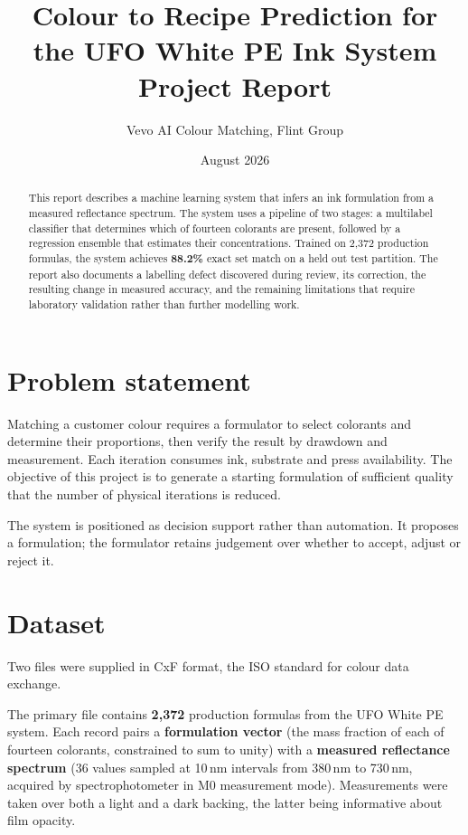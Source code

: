 \documentclass[11pt,a4paper]{article}
\title{\textbf{Colour to Recipe Prediction for the UFO White PE Ink System}\\[4pt]
       \large Project Report}
\author{Vevo AI Colour Matching, Flint Group}
\date{August 2026}
\newcommand{\keyfig}[1]{\textcolor{accent}{\textbf{#1}}}
\begin{document}
\maketitle

\begin{abstract}
\noindent
This report describes a machine learning system that infers an ink formulation
from a measured reflectance spectrum. The system uses a pipeline of two stages:
a multilabel classifier that determines which of fourteen colorants are present,
followed by a regression ensemble that estimates their concentrations. Trained on
2{,}372 production formulas, the system achieves \keyfig{88.2\%} exact set match
on a held out test partition. The report also documents a labelling defect
discovered during review, its correction, the resulting change in measured
accuracy, and the remaining limitations that require laboratory validation
rather than further modelling work.
\end{abstract}

\section{Problem statement}

Matching a customer colour requires a formulator to select colorants and
determine their proportions, then verify the result by drawdown and measurement.
Each iteration consumes ink, substrate and press availability. The objective of
this project is to generate a starting formulation of sufficient quality that
the number of physical iterations is reduced.

The system is positioned as decision support rather than automation. It proposes
a formulation; the formulator retains judgement over whether to accept, adjust or
reject it.

\section{Dataset}

Two files were supplied in CxF format, the ISO standard for colour data exchange.

The primary file contains \keyfig{2{,}372} production formulas from the UFO White
PE system. Each record pairs a \textbf{formulation vector} (the mass fraction of
each of fourteen colorants, constrained to sum to unity) with a \textbf{measured
reflectance spectrum} (36 values sampled at 10\,nm intervals from 380\,nm to
730\,nm, acquired by spectrophotometer in M0 measurement mode). Measurements were
taken over both a light and a dark backing, the latter being informative about
film opacity.
\end{document}
